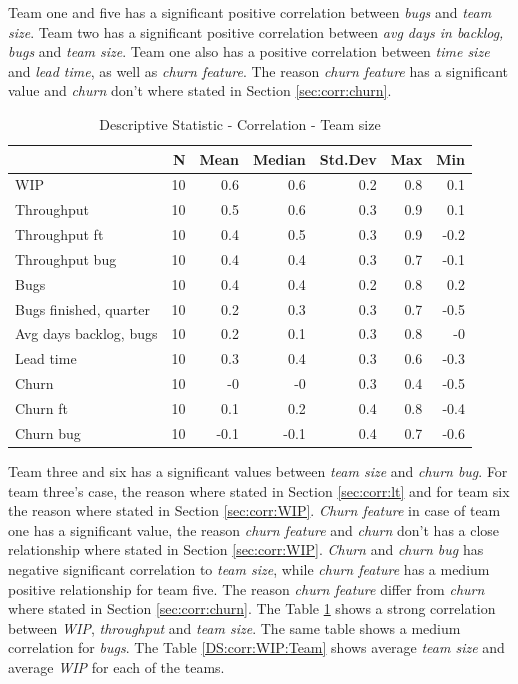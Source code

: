 \documentclass[UKenglish]{ifimaster}  %
\begin{document}
Team one and five has a significant positive correlation between \textit{bugs} and \textit{team size}. Team two has a significant positive correlation between \textit{avg days in backlog, bugs} and \textit{team size}. Team one also has a positive correlation between \textit{time size} and \textit{lead time},  as well as \textit{churn feature}. The reason \textit{churn feature} has a significant value and \textit{churn} don't where stated in Section \ref{sec:corr:churn}. 

\begin{table}[!htbp]
 \centering
 \begin{tabular}{ | l | r | r | r | r | r | r | }
 \hline
& \bf{N} & \bf{Mean} & \bf{Median} & \bf{Std.Dev} & \bf{Max} & \bf{Min} \\ \hline
WIP  & 10 & 0.6 & 0.6 & 0.2 & 0.8 & 0.1\\ \hline
Throughput  & 10 & 0.5 & 0.6 & 0.3 & 0.9 & 0.1\\ \hline
Throughput ft  & 10 & 0.4 & 0.5 & 0.3 & 0.9 & -0.2\\ \hline
Throughput bug  & 10 & 0.4 & 0.4 & 0.3 & 0.7 & -0.1\\ \hline
Bugs  & 10 & 0.4 & 0.4 & 0.2 & 0.8 & 0.2\\ \hline
Bugs finished, quarter  & 10 & 0.2 & 0.3 & 0.3 & 0.7 & -0.5\\ \hline
Avg days backlog, bugs  & 10 & 0.2 & 0.1 & 0.3 & 0.8 & -0\\ \hline
Lead time & 10 & 0.3 & 0.4 & 0.3 & 0.6 & -0.3\\ \hline
Churn  & 10 & -0 & -0 & 0.3 & 0.4 & -0.5\\ \hline
Churn ft  & 10 & 0.1 & 0.2 & 0.4 & 0.8 & -0.4\\ \hline
Churn bug  & 10 & -0.1 & -0.1 & 0.4 & 0.7 & -0.6\\ \hline
\end{tabular}
 \caption{Descriptive Statistic - Correlation - Team size}
 \label{DS:corr:TS}
 \end{table}
  Team three and six has a significant values between \textit{team size} and \textit{churn bug}. For team three's case, the reason where stated in Section \ref{sec:corr:lt} and for team six the reason where stated in Section \ref{sec:corr:WIP}. \textit{Churn feature} in case of team one has a significant value, the reason \textit{churn feature} and \textit{churn} don't has a close relationship where stated in Section \ref{sec:corr:WIP}. \textit{Churn} and \textit{churn bug} has negative significant correlation to \textit{team size}, while \textit{churn feature} has a medium positive relationship for team five. The reason \textit{churn feature} differ from \textit{churn} where stated in Section \ref{sec:corr:churn}. The Table \ref{DS:corr:TS} shows a strong correlation between \textit{WIP}, \textit{throughput} and \textit{team size}. The same table shows a medium correlation for \textit{bugs}. The Table \ref{DS:corr:WIP:Team} shows average \textit{team size} and average \textit{WIP} for each of the teams.
\end{document}
